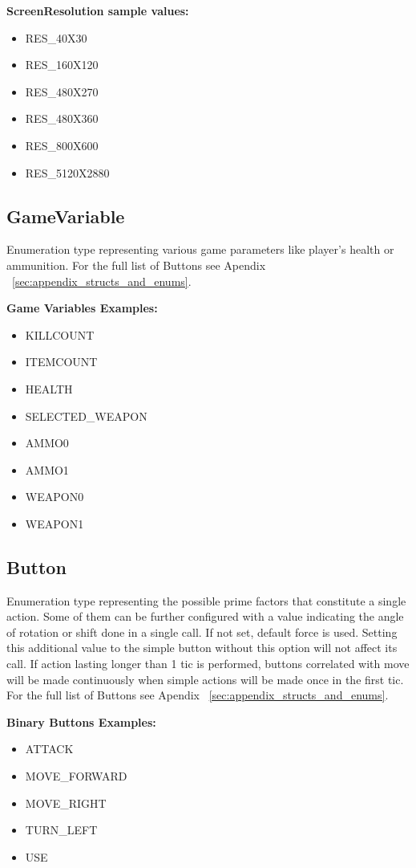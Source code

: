 \vspace{20pt}
\textbf{ScreenResolution sample values:}
\begin{itemize}
\item RES\_40X30
\item RES\_160X120	
\item RES\_480X270	
\item RES\_480X360	
\item RES\_800X600
\item RES\_5120X2880
\end{itemize}

\subsection{GameVariable} \label{subsec:gamevar}
Enumeration type representing various game parameters like player's health or ammunition. For the full list of Buttons see Apendix ~\ref{sec:appendix_structs_and_enums}.


\vspace{20pt}
\textbf{Game Variables Examples:}
\begin{itemize}
	\item KILLCOUNT
	\item ITEMCOUNT
	\item HEALTH
	\item SELECTED\_WEAPON
	\item AMMO0
	\item AMMO1
	\item WEAPON0
	\item WEAPON1
\end{itemize}

\subsection{Button} \label{subsec:button}

	Enumeration type representing the possible prime factors that constitute a single action. Some of them can be further configured with a value indicating the angle of rotation or shift done in a single call. If not set, default force is used. Setting this additional value to the simple button without this option will not affect its call. If action lasting longer than 1 tic is performed, buttons correlated with move will be made continuously when simple actions will be made once in the first tic. For the full list of Buttons see Apendix ~\ref{sec:appendix_structs_and_enums}.


\vspace{20pt}
\textbf{Binary Buttons Examples:}
\begin{itemize} 
	\item ATTACK
	\item MOVE\_FORWARD
	\item MOVE\_RIGHT
	\item TURN\_LEFT
	\item USE
\end{itemize}

